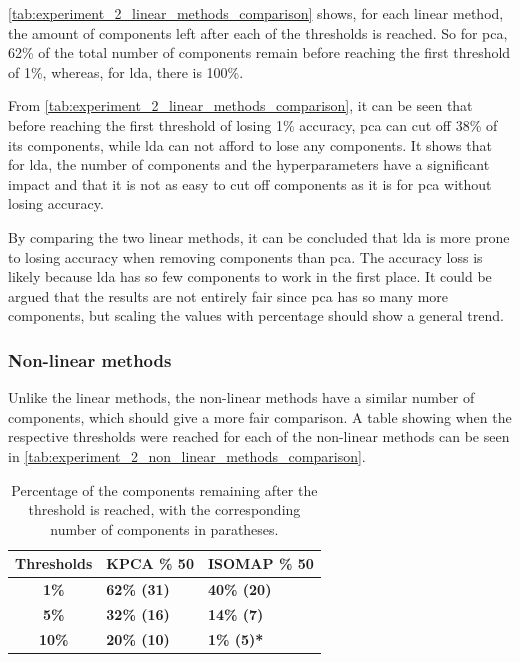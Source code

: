 \autoref{tab:experiment_2_linear_methods_comparison} shows, for each linear method, the amount of components left after each of the thresholds is reached. So for \gls{pca}, 62\% of the total number of components remain before reaching the first threshold of 1\%, whereas, for \gls{lda}, there is 100\%.

From \autoref{tab:experiment_2_linear_methods_comparison}, it can be seen that before reaching the first threshold of losing 1\% accuracy, \gls{pca} can cut off 38\% of its components, while \gls{lda} can not afford to lose any components. It shows that for \gls{lda}, the number of components and the hyperparameters have a significant impact and that it is not as easy to cut off components as it is for \gls{pca} without losing accuracy.

By comparing the two linear methods, it can be concluded that \gls{lda} is more prone to losing accuracy when removing components than \gls{pca}. The accuracy loss is likely because \gls{lda} has so few components to work in the first place. It could be argued that the results are not entirely fair since \gls{pca} has so many more components, but scaling the values with percentage should show a general trend.


\subsubsection{Non-linear methods}
Unlike the linear methods, the non-linear methods have a similar number of components, which should give a more fair comparison. A table showing when the respective thresholds were reached for each of the non-linear methods can be seen in \autoref{tab:experiment_2_non_linear_methods_comparison}.

\begin{table}[htb!]
    \centering
    \begin{tabular}{cp{}p{}}
        \toprule
        \textbf{Thresholds} & \textbf{KPCA \% 50} & \textbf{ISOMAP \% 50} \\
        \midrule
        \textbf{1\%} & \textbf{62\% (31)} & \textbf{40\% (20)} \\
        \textbf{5\%} & \textbf{32\% (16)} & \textbf{14\% (7)} \\ 
        \textbf{10\%} & \textbf{20\% (10)} & \textbf{1\% (5)*} \\
        \bottomrule
    \end{tabular}
    \caption{Percentage of the components remaining after the threshold is reached, with the corresponding number of components in paratheses.}
    \label{tab:experiment_2_non_linear_methods_comparison}
\end{table}

